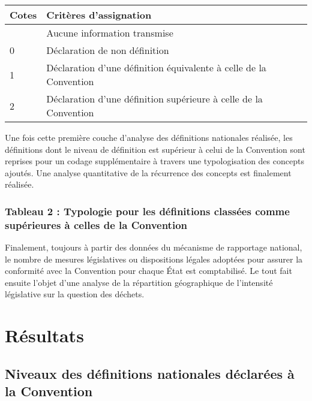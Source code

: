 \documentclass[12pt]{ulaval}
\begin{document}
\begin{longtable}[]{@{}ll@{}}
\toprule\noalign{}
Cotes & Critères d'assignation \\
\midrule\noalign{}
\endhead
\bottomrule\noalign{}
\endlastfoot
-1 & Aucune information transmise \\
0 & Déclaration de non définition \\
1 & Déclaration d'une définition équivalente à celle de la Convention \\
2 & Déclaration d'une définition supérieure à celle de la Convention \\
\end{longtable}

Une fois cette première couche d'analyse des définitions nationales réalisée, les définitions dont le niveau de définition est supérieur à celui de la Convention sont reprises pour un codage supplémentaire à travers une typologisation des concepts ajoutés. Une analyse quantitative de la récurrence des concepts est finalement réalisée.

\subsubsection{Tableau 2 : Typologie pour les définitions classées comme supérieures à celles de la Convention}\label{tableau-2-typologie-pour-les-duxe9finitions-classuxe9es-comme-supuxe9rieures-uxe0-celles-de-la-convention}

Finalement, toujours à partir des données du mécanisme de rapportage national, le nombre de mesures législatives ou dispositions légales adoptées pour assurer la conformité avec la Convention pour chaque État est comptabilisé. Le tout fait ensuite l'objet d'une analyse de la répartition géographique de l'intensité législative sur la question des déchets.

\section{Résultats}\label{ruxe9sultats}

\subsection{Niveaux des définitions nationales déclarées à la Convention}\label{niveaux-des-duxe9finitions-nationales-duxe9claruxe9es-uxe0-la-convention}
\end{document}
